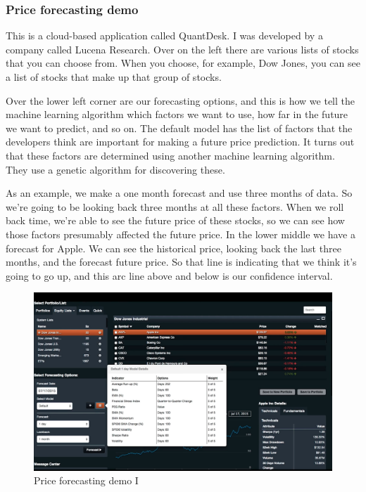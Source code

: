 \documentclass[12pt]{article}
\begin{document}
\subsubsection{Price forecasting demo}

This is a cloud-based application called QuantDesk. I was developed by a company called Lucena Research. Over on the left there are various lists of stocks that you can choose from. When you choose, for example, Dow Jones, you can see a list of stocks that make up that group of stocks. 

Over the lower left corner are our forecasting options, and this is how we tell the machine learning algorithm which factors we want to use, how far in the future we want to predict, and so on. The default model has the list of factors that the developers think are important for making a future price prediction. It turns out that these factors are determined using another machine learning algorithm. They use a genetic algorithm for discovering these. 

As an example, we make a one month forecast and use three months of data. So we're going to be looking back three months at all these factors. When we roll back time, we're able to see the future price of these stocks, so we can see how those factors presumably affected the future price. In the lower middle we have a forecast for Apple. We can see the historical price, looking back the last three months, and the forecast future price. So that line is indicating that we think it's going to go up, and this arc line above and below is our confidence interval. 

\begin{figure}[!ht]
\centering
\includegraphics[scale=0.35]{fig/fig75}
\caption{Price forecasting demo I}
\end{figure}
\end{document}
